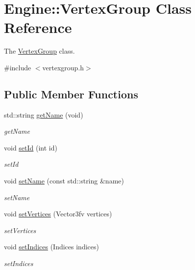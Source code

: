 \hypertarget{classEngine_1_1VertexGroup}{}\section{Engine\+:\+:Vertex\+Group Class Reference}
\label{classEngine_1_1VertexGroup}


The \hyperlink{classEngine_1_1VertexGroup}{Vertex\+Group} class.  




{\ttfamily \#include $<$vertexgroup.\+h$>$}

\subsection*{Public Member Functions}
\begin{DoxyCompactItemize}
\item 
std\+::string \hyperlink{classEngine_1_1VertexGroup_ab757c5820148459b98a753eb439e711d}{get\+Name} (void)
\begin{DoxyCompactList}\small\item\em get\+Name \end{DoxyCompactList}\item 
void \hyperlink{classEngine_1_1VertexGroup_a73afbdae31214fa9699c92dc30f4423e}{set\+Id} (int id)
\begin{DoxyCompactList}\small\item\em set\+Id \end{DoxyCompactList}\item 
void \hyperlink{classEngine_1_1VertexGroup_a0e28f3e7a8d2ebb624a1ff4bfa3165a7}{set\+Name} (const std\+::string \&name)
\begin{DoxyCompactList}\small\item\em set\+Name \end{DoxyCompactList}\item 
void \hyperlink{classEngine_1_1VertexGroup_a8152e85dfcfb5db18a18159dc8548928}{set\+Vertices} (Vector3fv vertices)
\begin{DoxyCompactList}\small\item\em set\+Vertices \end{DoxyCompactList}\item 
void \hyperlink{classEngine_1_1VertexGroup_a035c2e4205c903083e5627c1712097c0}{set\+Indices} (Indices indices)
\begin{DoxyCompactList}\small\item\em set\+Indices \end{DoxyCompactList}\item 

\end{DoxyCompactItemize}
